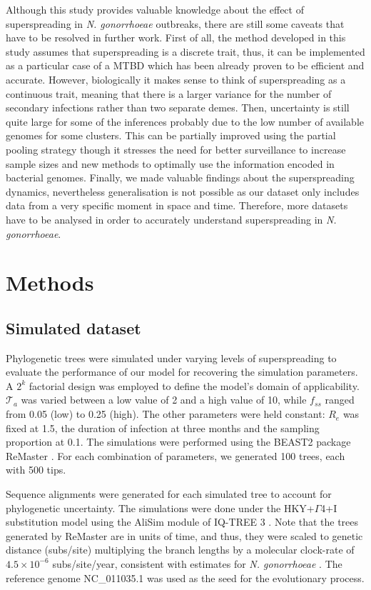 \documentclass[lineno,pdflatex,sn-nature]{sn-jnl}%
\theoremstyle{thmstyleone}%
\theoremstyle{thmstyletwo}%
\theoremstyle{thmstylethree}%
\begin{document}
Although this study provides valuable knowledge about the effect of superspreading in \textit{N. gonorrhoeae} outbreaks, there are still some caveats that have to be resolved in further work. First of all, the method developed in this study assumes that superspreading is a discrete trait, thus, it can be implemented as a particular case of a MTBD which has been already proven to be efficient and accurate. However, biologically it makes sense to think of superspreading as a continuous trait, meaning that there is a larger variance for the number of secondary infections rather than two separate demes. Then, uncertainty is still quite large for some of the inferences probably due to the low number of available genomes for some clusters. This can be partially improved using the partial pooling strategy though it stresses the need for better surveillance to increase sample sizes and new methods to optimally use the information encoded in bacterial genomes. Finally, we made valuable findings about the superspreading dynamics, nevertheless generalisation is not possible as our dataset only includes data from a very specific moment in space and time. Therefore, more datasets have to be analysed in order to accurately understand superspreading in \textit{N. gonorrhoeae}.



\section{Methods}\label{sec11}

\subsection{Simulated dataset}
Phylogenetic trees were simulated under varying levels of superspreading to evaluate the performance of our model for recovering the simulation parameters. A $2^k$ factorial design was employed to define the model’s domain of applicability. $\mathcal{T}_a$ was varied between a low value of 2 and a high value of 10, while $f_{ss}$ ranged from 0.05 (low) to 0.25 (high). The other parameters were held constant: $R_{e}$ was fixed at 1.5, the duration of infection at three months and the sampling proportion at 0.1. The simulations were performed using the BEAST2 package ReMaster \cite{tim2024remaster}. For each combination of parameters, we generated 100 trees, each with 500 tips.\newline

Sequence alignments were generated for each simulated tree to account for phylogenetic uncertainty. The simulations were done under the HKY+$\Gamma$4+I substitution model using the AliSim module of IQ-TREE 3 \cite{Nguyen2015iqtree,ly2022alisim}. Note that the trees generated by ReMaster are in units of time, and thus, they were scaled to genetic distance (subs/site) multiplying the branch lengths by a molecular clock-rate of $4.5 \times10^{-6}$ subs/site/year, consistent with estimates for \textit{N. gonorrhoeae} \cite{Snchez-Bus2019impact}. The reference genome NC\_011035.1 \cite{Gyung2008complete} was used as the seed for the evolutionary process.\newline  
\end{document}
